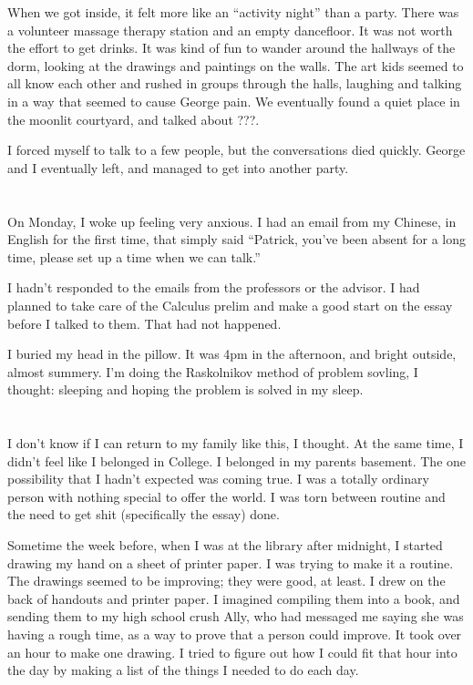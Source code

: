 When we got inside, it felt more like an ``activity night'' than a party.  There
was a volunteer massage therapy station and an empty dancefloor.  It was not
worth the effort to get drinks.  It was kind of fun to wander around the
hallways of the dorm, looking at the drawings and paintings on the walls.  The
art kids seemed to all know each other and rushed in groups through the halls,
laughing and talking in a way that seemed to cause George pain.  We eventually
found a quiet place in the moonlit courtyard, and talked about ???. 

I forced myself to talk to a few people, but the conversations died quickly.
George and I eventually left, and managed to get into another party.

\section{}
On Monday, I woke up feeling very anxious.  I had an email from my
Chinese, in English for the first time, that simply said ``Patrick, you've been
absent for a long time, please set up a time when we can talk.''

I hadn't responded to the emails from the professors or the advisor.  I had
planned to take care of the Calculus prelim and make a good start on the essay
before I talked to them.  That had not happened.

I buried my head in the pillow.  It was 4pm in the afternoon, and bright
outside, almost summery.  I'm doing the Raskolnikov method of problem sovling, I
thought: sleeping and hoping the problem is solved in my sleep.

\section{}

I don't know if I can return to my family like this, I thought.  At the same
time, I didn't feel like I belonged in College.  I belonged in my parents
basement.  The one possibility that I hadn't expected was coming true.  I was a
totally ordinary person with nothing special to offer the world.  I was torn
between routine and the need to get shit (specifically the essay) done.    

Sometime the week before, when I was at the library after midnight, I started
drawing my hand on a sheet of printer paper.  I was trying to make it a routine.
The drawings seemed to be improving; they were good, at least.  I drew on the
back of handouts and printer paper.  I imagined compiling them into a book, and
sending them to my high school crush Ally, who had messaged me saying she was
having a rough time, as a way to prove that a person could improve.  It took
over an hour to make one drawing.  I tried to figure out how I could fit that
hour into the day by making a list of the things I needed to do each day. 


